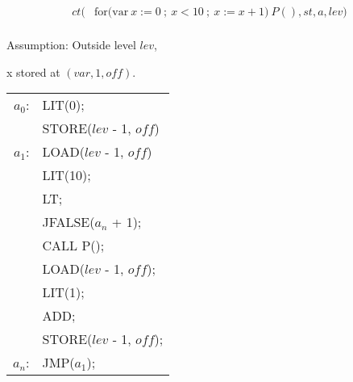 \begin{align*}
ct(&\text{for(var}\: x := 0\:;\: x < 10\:;\: x := x + 1) \:P(), st, a, lev)  \\
\end{align*}
\begin{minipage}{0.5\textwidth}
Assumption: Outside level $lev$, 

x stored at $(var, 1, off)$.

\begin{tabular}{rl}
    $a_0$:& LIT(0); \\
    & STORE($lev$ - 1, $off$) \\
    $a_1$:& LOAD($lev$ - 1, $off$) \\
    & LIT(10); \\
    & LT; \\
    & JFALSE($a_n$ + 1); \\
    & CALL P(); \\
    & LOAD($lev$ - 1, $off$); \\
    & LIT(1); \\
    & ADD; \\
    & STORE($lev$ - 1, $off$); \\
    $a_n$: & JMP($a_1$); \\
\end{tabular}
\end{minipage}
